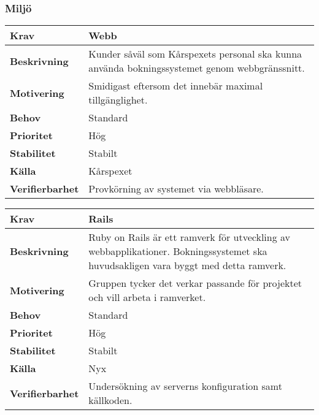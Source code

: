 \documentclass[a4paper, twoside, 11pt, titlepage]{article}
\begin{document}
		\subsubsection{Miljö}


		\begin{tabular} { p{2.6cm} p{12.5cm} }
			\hline
			\sffamily\textbf{Krav} & Webb  \\
			\hline
			\sffamily\textbf{Beskrivning} & Kunder såväl som Kårspexets personal ska kunna använda bokningssystemet genom webbgränssnitt.  \\
			\hline
			\sffamily\textbf{Motivering} & Smidigast eftersom det innebär maximal tillgänglighet.  \\
			\hline
			\sffamily\textbf{Behov} & Standard  \\
			\hline
			\sffamily\textbf{Prioritet} & Hög  \\
			\hline
			\sffamily\textbf{Stabilitet} & Stabilt  \\
			\hline
			\sffamily\textbf{Källa} & Kårspexet  \\
			\hline
			\sffamily\textbf{Verifierbarhet} & Provkörning av systemet via webbläsare.  \\
			\hline
		\end{tabular}
		\vspace{6mm}

		\begin{tabular} { p{2.6cm} p{12.5cm} }
			\hline
			\sffamily\textbf{Krav} & Rails  \\
			\hline
			\sffamily\textbf{Beskrivning} & Ruby on Rails är ett ramverk för utveckling av webbapplikationer. Bokningssystemet ska huvudsakligen vara byggt med detta ramverk.  \\
			\hline
			\sffamily\textbf{Motivering} & Gruppen tycker det verkar passande för projektet och vill arbeta i ramverket.  \\
			\hline
			\sffamily\textbf{Behov} & Standard  \\
			\hline
			\sffamily\textbf{Prioritet} & Hög  \\
			\hline
			\sffamily\textbf{Stabilitet} & Stabilt  \\
			\hline
			\sffamily\textbf{Källa} & Nyx  \\
			\hline
			\sffamily\textbf{Verifierbarhet} & Undersökning av serverns konfiguration samt källkoden.  \\
			\hline
		\end{tabular}
		\vspace{6mm}
\end{document}
